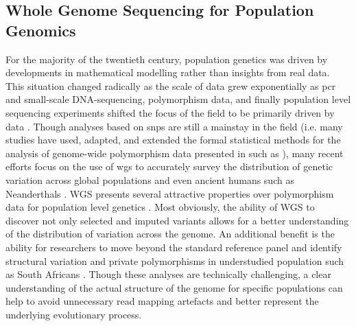 \subsection{Whole Genome Sequencing for Population Genomics} \label{intro:popgen}

For the majority of the twentieth century, population genetics was driven by developments in mathematical modelling rather than insights from real data. This situation changed radically as the scale of data grew exponentially as \gls{pcr} and small-scale DNA-sequencing, polymorphism data, and finally population level sequencing experiments shifted the focus of the field to be primarily driven by data \cite{Kreitman1983,JE2010,Crawford2012}. Though analyses based on \glspl{snp} are still a mainstay in the field (i.e. many studies have used, adapted, and extended the formal statistical methods for the analysis of genome-wide polymorphism data presented in \textcite{Patterson2012a} such as \cite{Skoglund2017,Durand2011,Lipson2017,Skoglund2015,Pickrell2012,Wall2000,Nielsen2017a,Carto2009,Margaryan2020}), many recent efforts focus on the use of \gls{wgs} to accurately survey the distribution of genetic variation across global populations and even ancient humans such as Neanderthals \cite{Fan2019a,Mallick2016,Prufer2014,Bergstrom2019, Auton2015}. WGS presents several attractive properties over polymorphism data for population level genetics \cite{Hoglund2019}. Most obviously, the ability of WGS to discover not only selected and imputed variants allows for a better understanding of the distribution of variation across the genome. An additional benefit is the ability for researchers to move beyond the standard reference panel and identify structural variation and private polymorphisms in understudied population such as South Africans \cite{Choudhury2017a}. Though these analyses are technically challenging, a clear understanding of the actual structure of the genome for specific populations can help to avoid unnecessary read mapping artefacts and better represent the underlying evolutionary process. 

